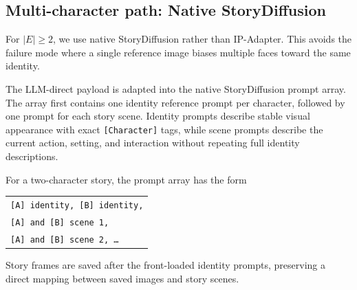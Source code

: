 



\subsection{Multi-character path: Native StoryDiffusion}
\label{sec:dual}
For $|E|\geq 2$, we use native StoryDiffusion rather than IP-Adapter. This avoids the failure mode where a single reference image biases multiple faces toward the same identity.

The LLM-direct payload is adapted into the native StoryDiffusion prompt array. The array first contains one identity reference prompt per character, followed by one prompt for each story scene. Identity prompts describe stable visual appearance with exact \texttt{[Character]} tags, while scene prompts describe the current action, setting, and interaction without repeating full identity descriptions.

For a two-character story, the prompt array has the form
\begin{center}
\small
\begin{tabular}{@{}l@{}}
\texttt{[A] identity, [B] identity,} \\
\texttt{[A] and [B] scene 1,} \\
\texttt{[A] and [B] scene 2, \ldots}
\end{tabular}
\end{center}
Story frames are saved after the front-loaded identity prompts,
preserving a direct mapping between saved images and story scenes.


